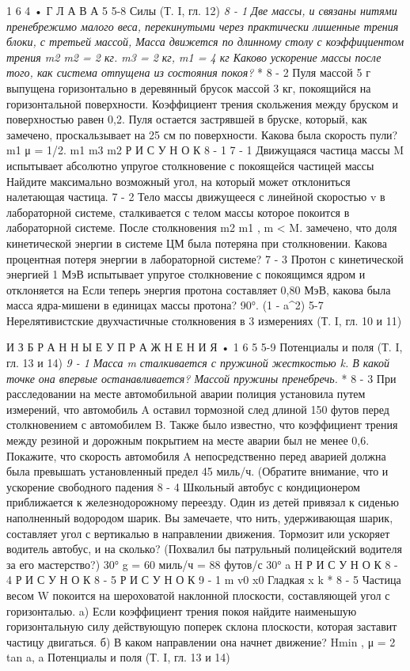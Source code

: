 \documentclass[10pt,oneside]{article}
\begin{document}
1 6 4 • Г Л А В А  5 5-8 Силы (Т. I, гл. 12) \emph{ 8 - 1 Две массы, и связаны нитями пренебрежимо малого веса, перекинутыми через практически лишенные трения блоки, с третьей массой, Масса движется по длинному столу с коэффициентом трения m2 m2 = 2 кг. m3 = 2 кг, m1 = 4 кг Каково ускорение массы после того, как система отпущена из состояния покоя? } * 8 - 2 Пуля массой 5 г выпущена горизонтально в деревянный брусок массой 3 кг, покоящийся на горизонтальной поверхности. Коэффициент трения скольжения между бруском и поверхностью равен 0,2. Пуля остается застрявшей в бруске, который, как замечено, проскальзывает на 25 см по поверхности. Какова была скорость пули? m1 μ = 1/2. m1 m3 m2 Р И С У Н О К  8 - 1 \emph{ } 7 - 1 Движущаяся частица массы M испытывает абсолютно упругое столкновение с покоящейся частицей массы Найдите максимально возможный угол, на который может отклониться налетающая частица. \emph{ } 7 - 2 Тело массы движущееся с линейной скоростью v в лабораторной системе, сталкивается с телом массы которое покоится в лабораторной системе. После столкновения m2 m1 , m < M. замечено, что доля кинетической энергии в системе ЦМ была потеряна при столкновении. Какова процентная потеря энергии в лабораторной системе? \emph{ } 7 - 3 Протон с кинетической энергией 1 МэВ испытывает упругое столкновение с покоящимся ядром и отклоняется на Если теперь энергия протона составляет 0,80 МэВ, какова была масса ядра-мишени в единицах массы протона? 90°. (1 - a\textasciicircum{}2) 5-7 Нерелятивистские двухчастичные столкновения в 3 измерениях (Т. I, гл. 10 и 11)\par

И З Б Р А Н Н Ы Е  У П Р А Ж Н Е Н И Я • 1 6 5 5-9 Потенциалы и поля (Т. I, гл. 13 и 14) \emph{ 9 - 1 Масса m сталкивается с пружиной жесткостью k. В какой точке она впервые останавливается? Массой пружины пренебречь. } * 8 - 3 При расследовании на месте автомобильной аварии полиция установила путем измерений, что автомобиль A оставил тормозной след длиной 150 футов перед столкновением с автомобилем B. Также было известно, что коэффициент трения между резиной и дорожным покрытием на месте аварии был не менее 0,6. Покажите, что скорость автомобиля A непосредственно перед аварией должна была превышать установленный предел 45 миль/ч. (Обратите внимание, что и ускорение свободного падения \emph{ } 8 - 4 Школьный автобус с кондиционером приближается к железнодорожному переезду. Один из детей привязал к сиденью наполненный водородом шарик. Вы замечаете, что нить, удерживающая шарик, составляет угол с вертикалью в направлении движения. Тормозит или ускоряет водитель автобус, и на сколько? (Похвалил бы патрульный полицейский водителя за его мастерство?) 30° g = 60 миль/ч = 88 футов/с 30° a H Р И С У Н О К  8 - 4 Р И С У Н О К  8 - 5 Р И С У Н О К  9 - 1 m v0 x0 Гладкая x k \emph{ } * 8 - 5 Частица весом W покоится на шероховатой наклонной плоскости, составляющей угол с горизонталью. a) Если коэффициент трения покоя найдите наименьшую горизонтальную силу действующую поперек склона плоскости, которая заставит частицу двигаться. б) В каком направлении она начнет движение? Hmin , μ = 2 tan a, a Потенциалы и поля (Т. I, гл. 13 и 14)\par
\end{document}
